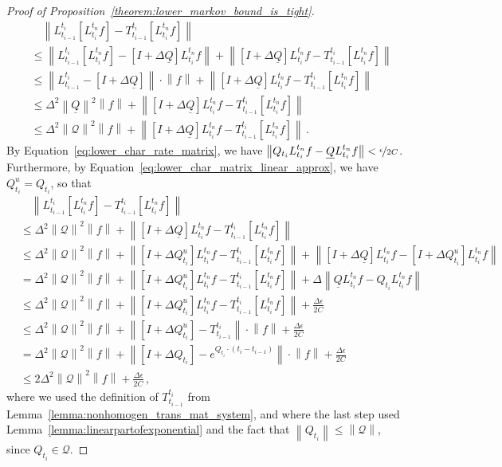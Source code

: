 \documentclass[10pt]{paper}
\theoremstyle{definition}
\newcommand{\rateset}{\mathcal{Q}}
\newcommand{\lrate}{\underline{Q}}
\newcommand{\norm}[1]{\left\lVert #1 \right\rVert}
\begin{document}
\begin{proof}[Proof of Proposition~\ref{theorem:lower_markov_bound_is_tight}]
\begin{align*}
&\quad \norm{L_{t_{i-1}}^{t_i}\left[L_{t_i}^{t_n}f\right] - T_{t_{i-1}}^{t_i}\left[L_{t_i}^{t_n}f\right]} \\
&\leq \norm{L_{t_{i-1}}^{t_i}\left[L_{t_i}^{t_n}f\right] - \left[I+\Delta\lrate\right]L_{t_i}^{t_n}f} + \norm{\left[I+\Delta\lrate\right]L_{t_i}^{t_n}f - T_{t_{i-1}}^{t_i}\left[L_{t_i}^{t_n}f\right]} \\
&\leq \norm{L_{t_{i-1}}^{t_i} - \left[I+\Delta\lrate\right]}\cdot\norm{f} + \norm{\left[I+\Delta\lrate\right]L_{t_i}^{t_n}f - T_{t_{i-1}}^{t_i}\left[L_{t_i}^{t_n}f\right]} \\
&\leq \Delta^2\norm{\lrate}^2\norm{f} + \norm{\left[I+\Delta\lrate\right]L_{t_i}^{t_n}f - T_{t_{i-1}}^{t_i}\left[L_{t_i}^{t_n}f\right]} \\
&\leq \Delta^2\norm{\mathcal{Q}}^2\norm{f} + \norm{\left[I+\Delta\lrate\right]L_{t_i}^{t_n}f - T_{t_{i-1}}^{t_i}\left[L_{t_i}^{t_n}f\right]}\,.
\end{align*}
By Equation~\eqref{eq:lower_char_rate_matrix}, we have $\norm{Q_{t_i}L_{t_i}^{t_n}f - \lrate L_{t_i}^{t_n}f} < \nicefrac{\epsilon}{2C}$. Furthermore, by Equation~\eqref{eq:lower_char_matrix_linear_approx}, we have $Q_{t_i}^u=Q_{t_i}$, so that
\begin{align*}
 &\quad \norm{L_{t_{i-1}}^{t_i}\left[L_{t_i}^{t_n}f\right] - T_{t_{i-1}}^{t_i}\left[L_{t_i}^{t_n}f\right]} \\
 &\leq \Delta^2\norm{\mathcal{Q}}^2\norm{f} + \norm{\left[I+\Delta\lrate\right]L_{t_i}^{t_n}f - T_{t_{i-1}}^{t_i}\left[L_{t_i}^{t_n}f\right]} \\
 &\leq \Delta^2\norm{\mathcal{Q}}^2\norm{f} + \norm{\left[I+\Delta Q_{t_i}^u\right]L_{t_i}^{t_n}f - T_{t_{i-1}}^{t_i}\left[L_{t_i}^{t_n}f\right]} + \norm{\left[I+\Delta \lrate\right]L_{t_i}^{t_n}f - \left[I+\Delta Q_{t_i}^u\right]L_{t_i}^{t_n}f} \\
 &= \Delta^2\norm{\mathcal{Q}}^2\norm{f} + \norm{\left[I+\Delta Q_{t_i}^u\right]L_{t_i}^{t_n}f - T_{t_{i-1}}^{t_i}\left[L_{t_i}^{t_n}f\right]} + \Delta\norm{\lrate L_{t_i}^{t_n}f - Q_{t_i}L_{t_i}^{t_n}f} \\
 &\leq \Delta^2\norm{\mathcal{Q}}^2\norm{f} + \norm{\left[I+\Delta Q_{t_i}^u\right]L_{t_i}^{t_n}f - T_{t_{i-1}}^{t_i}\left[L_{t_i}^{t_n}f\right]} + \frac{\Delta\epsilon}{2C} \\
 &\leq \Delta^2\norm{\mathcal{Q}}^2\norm{f} + \norm{\left[I+\Delta Q_{t_i}^u\right] - T_{t_{i-1}}^{t_i}}\cdot\norm{f} + \frac{\Delta\epsilon}{2C} \\
 &= \Delta^2\norm{\mathcal{Q}}^2\norm{f} + \norm{\left[I+\Delta Q_{t_i}\right] - e^{Q_{t_i}\cdot(t_i-t_{i-1})}}\cdot\norm{f} + \frac{\Delta\epsilon}{2C} \\
 &\leq 2\Delta^2\norm{\mathcal{Q}}^2\norm{f} + \frac{\Delta\epsilon}{2C}\,,
\end{align*}
where we used the definition of $T_{t_{i-1}}^{t_i}$ from Lemma~\ref{lemma:nonhomogen_trans_mat_system}, and where the last step used Lemma~\ref{lemma:linearpartofexponential} and the fact that $\norm{Q_{t_i}}\leq\norm{\rateset}$, since $Q_{t_i}\in\rateset$.


\end{proof}
\end{document}
